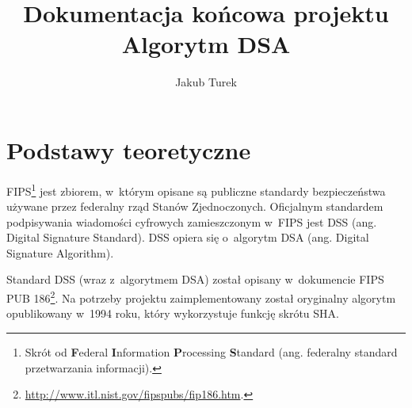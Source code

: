 \documentclass{article}
\title{Dokumentacja końcowa projektu \\ \Large{Algorytm DSA}}
\author{Jakub Turek}
\date{}
\begin{document}
    \maketitle

    \section*{Podstawy teoretyczne}
    
        FIPS\footnote{Skrót od \textbf{F}ederal \textbf{I}nformation \textbf{P}rocessing \textbf{S}tandard (ang. federalny standard przetwarzania informacji).} jest zbiorem, w~którym opisane są publiczne standardy bezpieczeństwa używane przez federalny rząd Stanów Zjednoczonych. Oficjalnym standardem podpisywania wiadomości cyfrowych zamieszczonym w~FIPS jest DSS (ang. Digital Signature Standard). DSS opiera się o~algorytm DSA (ang. Digital Signature Algorithm).
    
        Standard DSS (wraz z~algorytmem DSA) został opisany w~dokumencie FIPS PUB 186\footnote{\url{http://www.itl.nist.gov/fipspubs/fip186.htm}.}. Na potrzeby projektu zaimplementowany został oryginalny algorytm opublikowany w~1994 roku, który wykorzystuje funkcję skrótu SHA.
        
\end{document}
